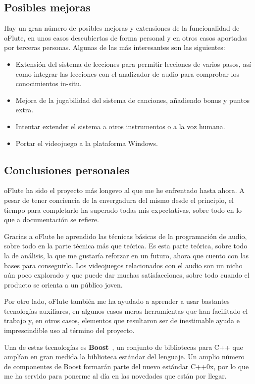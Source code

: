 \documentclass[a4paper,11pt]{article}
\begin{document}
\subsection{Posibles mejoras}
Hay un gran número de posibles mejoras y extensiones de la funcionalidad de
oFlute, en unos casos descubiertas de forma personal y en otros casos aportadas
por terceras personas. Algunas de las más interesantes son las siguientes:
\begin{itemize}
\item Extensión del sistema de lecciones para permitir lecciones de varios
  pasos, así como integrar las lecciones con el analizador de audio para
  comprobar los conocimientos in-situ.
\item Mejora de la jugabilidad del sistema de canciones, añadiendo bonus y
  puntos extra.
\item Intentar extender el sistema a otros instrumentos o a la voz humana.
\item Portar el videojuego a la plataforma Windows.
\end{itemize}

\subsection{Conclusiones personales}

oFlute ha sido el proyecto más longevo al que me he enfrentado hasta ahora. A
pesar de tener conciencia de la envergadura del mismo desde el principio, el
tiempo para completarlo ha superado todas mis expectativas, sobre todo en lo que
a documentación se refiere. 

Gracias a oFlute he aprendido las técnicas básicas de la programación de audio,
sobre todo en la parte técnica más que teórica. Es esta parte teórica, sobre
todo la de análisis, la que me gustaría reforzar en un futuro, ahora que cuento
con las bases para conseguirlo. Los videojuegos relacionados con el audio
son un nicho aún poco explorado y que puede dar muchas satisfacciones, sobre
todo cuando el producto se orienta a un público joven.

Por otro lado, oFlute también me ha ayudado a aprender a usar bastantes
tecnologías auxiliares, en algunos casos meras herramientas que han facilitado
el trabajo y, en otros casos, elementos que resultaron ser de inestimable ayuda
e imprescindible uso al término del proyecto.

Una de estas tecnologías es \textbf{Boost}~\cite{boost}, un conjunto de
bibliotecas para C++ que amplían en gran medida la biblioteca estándar del
lenguaje. Un amplio número de componentes de Boost formarán parte del nuevo
estándar C++0x, por lo que me ha servido para ponerme al día en las novedades
que están por llegar.
\end{document}

